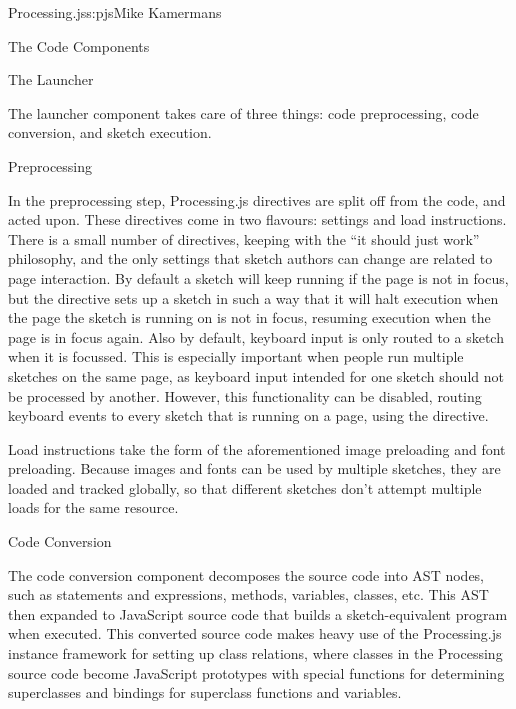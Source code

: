 \begin{aosachapter}{Processing.js}{s:pjs}{Mike Kamermans}
\begin{aosasect1}{The Code Components}
\begin{aosasect2}{The Launcher}

The launcher component takes care of three things: code preprocessing,
code conversion, and sketch execution.

\begin{aosasect3}{Preprocessing}

In the preprocessing step, Processing.js directives are split off from
the code, and acted upon. These directives come in two flavours:
settings and load instructions. There is a small number of directives,
keeping with the ``it should just work'' philosophy, and the only
settings that sketch authors can change are related to page
interaction. By default a sketch will keep running if the page is not
in focus, but the  directive sets up a sketch in
such a way that it will halt execution when the page the sketch is
running on is not in focus, resuming execution when the page is in
focus again. Also by default, keyboard input is only routed to a
sketch when it is focussed. This is especially important when people
run multiple sketches on the same page, as keyboard input intended for
one sketch should not be processed by another. However, this
functionality can be disabled, routing keyboard events to every sketch
that is running on a page, using the  directive.

Load instructions take the form of the aforementioned image preloading
and font preloading. Because images and fonts can be used by multiple
sketches, they are loaded and tracked globally, so that different
sketches don't attempt multiple loads for the same resource.

\end{aosasect3}

\begin{aosasect3}{Code Conversion}

The code conversion component decomposes the source code into AST
nodes, such as statements and expressions, methods, variables,
classes, etc. This AST then expanded to JavaScript source code that
builds a sketch-equivalent program when executed. This converted
source code makes heavy use of the Processing.js instance framework
for setting up class relations, where classes in the Processing source
code become JavaScript prototypes with special functions for
determining superclasses and bindings for superclass functions and
variables.

\end{aosasect3}


\end{aosasect2}
\end{aosasect1}
\end{aosachapter}
